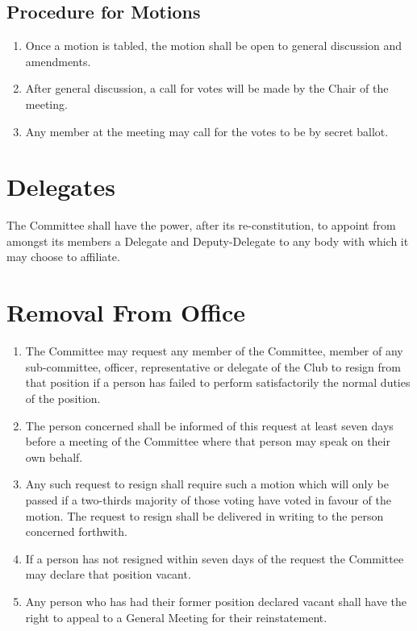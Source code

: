\documentclass[11pt]{article} %
\begin{document}
\subsection{Procedure for Motions}
\begin{enumerate}
	\item Once a motion is tabled, the motion shall be open to general discussion and amendments.
	\item After general discussion, a call for votes will be made by the Chair of the meeting.
	\item Any member at the meeting may call for the votes to be by secret ballot.
\end{enumerate}

\section{Delegates}
The Committee shall have the power, after its re-constitution, to appoint from amongst its members a Delegate and Deputy-Delegate to any body with which it may choose to affiliate.

\section{Removal From Office}
\begin{enumerate}
	\item The Committee may request any member of the Committee, member of any sub-committee, officer, representative or delegate of the Club to resign from that position if a person has failed to perform satisfactorily the normal duties of the position.
	\item The person concerned shall be informed of this request at least seven days before a meeting of the Committee where that person may speak on their own behalf.
	\item Any such request to resign shall require such a motion which will only be passed if a two-thirds majority of those voting have voted in favour of the motion. The request to resign shall be delivered in writing to the person concerned forthwith.
	\item If a person has not resigned within seven days of the request the Committee may declare that position vacant.
	\item Any person who has had their former position declared vacant shall have the right to appeal to a General Meeting for their reinstatement.
\end{enumerate}
\end{document}
